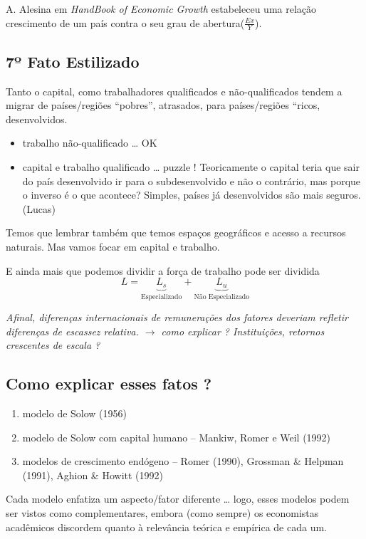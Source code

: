\documentclass[a4paper,12pt]{article}[abntex2]
\begin{document}
A. Alesina em \textit{HandBook of Economic Growth} estabeleceu uma relação crescimento de um país contra o seu grau de abertura($\frac{Ex}{Y}$). 

\subsection{\textbf{7º Fato Estilizado}}
Tanto o capital, como trabalhadores qualificados e não-qualificados tendem a migrar de países/regiões “pobres”, atrasados, para países/regiões “ricos, desenvolvidos.\begin{itemize}
    \item trabalho não-qualificado … OK
    \item capital e trabalho qualificado  … puzzle ! Teoricamente o capital teria que sair do país desenvolvido ir para o subdesenvolvido e não o contrário, mas porque o inverso é o que acontece? Simples, países já desenvolvidos são mais seguros. (Lucas)
\end{itemize}

Temos que lembrar também que temos espaços geográficos e acesso a recursos naturais. Mas vamos focar em capital e trabalho.

E ainda mais que podemos dividir a força de trabalho pode ser dividida\[L=\underbrace{L_s}_{\text{Especializado}}+\underbrace{L_u}_{\text{Não Especializado}}
 \]
 
\textit{Afinal, diferenças internacionais de remunerações dos fatores deveriam refletir diferenças de escassez relativa. $\rightarrow$ como explicar ? Instituições, retornos crescentes de escala ?}

\subsection{\textbf{Como explicar esses fatos ?}}\begin{enumerate}
    \item modelo de Solow (1956)
    \item modelo de Solow com capital humano – Mankiw, Romer e Weil (1992)
    \item modelos de crescimento endógeno – Romer (1990), Grossman \& Helpman (1991), Aghion \& Howitt (1992)
\end{enumerate}

Cada modelo enfatiza um aspecto/fator diferente … logo, esses modelos podem ser vistos como complementares, embora (como sempre) os economistas acadêmicos discordem quanto à relevância teórica e empírica de cada um.
\end{document}
